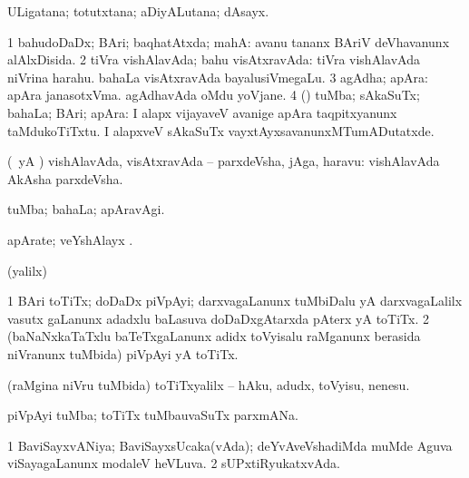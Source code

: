 \bentry
{} 
\gl{\nA}
\expl{}
\bmng
 ULigatana; totutxtana; aDiyALutana; dAsayx. 
\emng
\eentry

\bentry
{} 
\gl{\gu}
\expl{}
\bmng
\bnum
\num{1} bahudoDaDx; BAri; baqhatAtxda; mahA:  avanu tananx BAriV deVhavanunx alAlxDisida. 
\num{2} tiVra vishAlavAda; bahu visAtxravAda:  tiVra vishAlavAda niVrina harahu.  bahaLa visAtxravAda bayalusiVmegaLu. 
\num{3} agAdha; apAra:  apAra janasotxVma.  agAdhavAda oMdu yoVjane. 
\num{4} (\AmA) tuMba; sAkaSuTx; bahaLa; BAri; apAra:  I alapx vijayaveV avanige apAra taqpitxyanunx taMdukoTiTxtu.  I alapxveV sAkaSuTx vayxtAyxsavanunxMTumADutatxde. 
\enum
\emng
\eentry

\bentry
{} 
\gl{\nA}
\expl{}
\bmng
 (\kAparx\ yA \rUpa) vishAlavAda, visAtxravAda -- parxdeVsha, jAga, haravu:  vishAlavAda AkAsha parxdeVsha. 
\emng
\eentry


\bentry
{} 
\gl{\kirxvi}
\expl{}
\bmng
 tuMba; bahaLa; apAravAgi. 
\emng
\eentry

\bentry
{} 
\gl{\nA}
\expl{}
\bmng
 apArate; veYshAlayx 
\emng
. \eentry

\bentry
{} 
\gl{\saMkiSx}
\expl{}
\bmng
(\UK yalilx)  
\emng
\eentry

\bentry
{} 
\gl{\nA}
\expl{}
\bmng
\bnum
\num{1} BAri toTiTx; doDaDx piVpAyi; darxvagaLanunx tuMbiDalu yA darxvagaLalilx vasutx gaLanunx adadxlu baLasuva doDaDxgAtarxda pAterx yA toTiTx. 
\num{2} (baNaNxkaTaTxlu baTeTxgaLanunx adidx toVyisalu raMganunx berasida niVranunx tuMbida) piVpAyi yA toTiTx. 
\enum
\emng
\eentry

\bentry
{} 
\gl{\sakirx}
\bmng
 (raMgina niVru tuMbida) toTiTxyalilx -- hAku, adudx, toVyisu, nenesu. 
\emng
\eentry

\bentry
{} 
\gl{\nA}
\bmng
piVpAyi tuMba; toTiTx tuMbauvaSuTx parxmANa. 
\emng
\eentry

\bentry
{} 
\gl{\gu}
\expl{}
\bmng
\bnum
\num{1} BaviSayxvANiya; BaviSayxsUcaka(vAda); deYvAveVshadiMda muMde Aguva viSayagaLanunx modaleV heVLuva. 
\num{2} sUPxtiRyukatxvAda. 
\enum
\emng
\eentry


